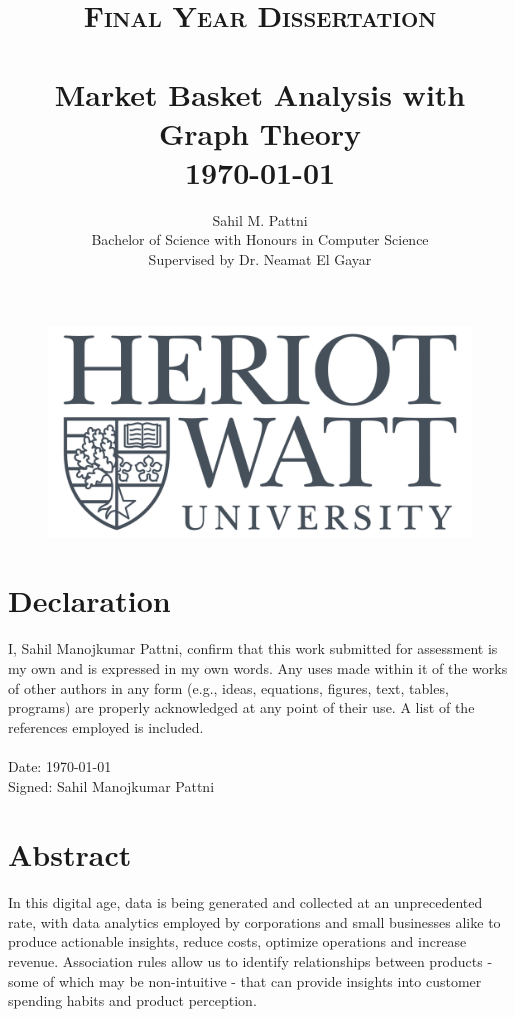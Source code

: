 \documentclass[paper=a4,fontsize=11pt]{report}	%
\title{	\normalsize \textsc{Final Year Dissertation} 	%
		 	\\[2.0cm]								%
			\HRule{0.5pt} \\						%
			\LARGE \textbf{{Market Basket Analysis with Graph Theory}}	%
			\HRule{2pt} \\ [0.5cm]		%
			\normalsize \today			%
		}
\author{
		Sahil M. Pattni\\	
		Bachelor of Science with Honours in Computer Science\\
        Supervised by Dr. Neamat El Gayar \\
}
\makeatletter
\def\printtitle{%
    {\centering \@title\par}}
\def\printauthor{%
    {\centering \large \@author}}
\newcommand{\me}{Sahil Manojkumar Pattni}        %
\makeatother
\begin{document}
\thispagestyle{empty}		%

\begin{figure}[H]
\centering
\includegraphics[scale=0.22]{hw_logo.png}
\end{figure}

\printtitle					%
  	\vfill


\printauthor				%

\thispagestyle{empty}		%
\pagebreak
\hspace{0pt}
\vfill
\section*{Declaration}
I, \me, confirm that this work submitted for assessment is my own and is expressed in my own words. Any uses made within it of the works of other authors in any form (e.g., ideas, equations, figures, text, tables, programs) are properly acknowledged at any point of their use. A list of the references employed is included.
\\\\Date: \today
\\Signed: \me

\vfill
\hspace{0pt}
\pagebreak

\newpage\section*{Abstract}
In this digital age, data is being generated and collected at an unprecedented rate, with data analytics employed by corporations and small businesses alike to produce actionable insights, reduce costs, optimize operations and increase revenue. Association rules allow us to identify relationships between products - some of which may be non-intuitive - that can provide insights into customer spending habits and product perception.
\end{document}
